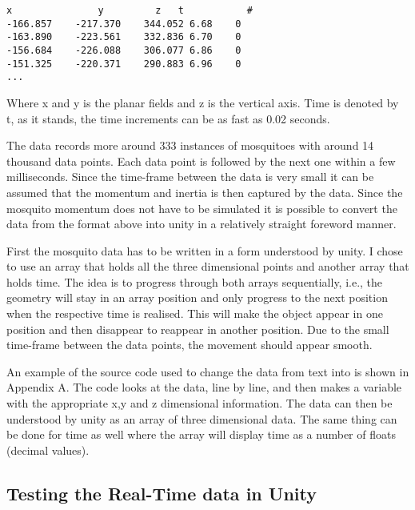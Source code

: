 \bigskip
\begin{code1}
\begin{verbatim}
x	            y	      z	  t           #
-166.857	-217.370	344.052	6.68	0
-163.890	-223.561	332.836	6.70	0
-156.684	-226.088	306.077	6.86	0
-151.325	-220.371	290.883	6.96	0
...
\end{verbatim}
\label{code:FlyData}
\end{code1}

Where x and y is the planar fields and z is the vertical axis. Time is denoted by t, as it stands, the time increments can be as fast as 0.02 seconds.

The data records more around 333 instances of mosquitoes with around 14 thousand data points. Each data point is followed by the next one within a few milliseconds. Since the time-frame between the data is very small it can be assumed that the momentum and inertia is then captured by the data. Since the mosquito momentum does not have to be simulated it is possible to convert the data from the format above into unity in a relatively straight foreword manner.

First the mosquito data has to be written in a form understood by unity. I chose to use an array that holds all the three dimensional points and another array that holds time. The idea is to progress through both arrays sequentially, i.e., the geometry will stay in an array position and only progress to the next position when the respective time is realised. This will make the object appear in one position and then disappear to reappear in another position. Due to the small time-frame between the data points, the movement should appear smooth.

An example of the source code used to change the data from text into  is shown in Appendix A. The code looks at the data, line by line, and then makes a  variable with the appropriate x,y and z dimensional information. The data can then be understood by unity as an array of three dimensional data. The same thing can be done for time as well where the array will display time as a number of floats (decimal values).

\subsection{Testing the Real-Time data in Unity }

